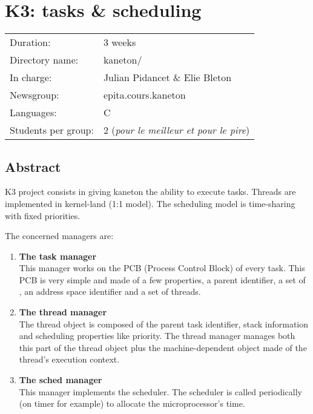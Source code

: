 
%
%

\chapter{K3: tasks \& scheduling}

%
%

\begin{tabular}{p{7cm}l}
Duration: & 3 weeks \\
Directory name: & kaneton/ \\
In charge: & Julian Pidancet \& Elie Bleton\\
Newsgroup: & epita.cours.kaneton \\
Languages: & C \\
Students per group: & 2 (\textit{pour le meilleur et pour le pire}) \\
\end{tabular}

\section{Abstract}

K3 project consists in giving kaneton the ability to execute
tasks. Threads are implemented in kernel-land (1:1 model). The
scheduling model is time-sharing with fixed priorities.

The concerned managers are:

\begin{enumerate}
  \item
    {\bf The task manager}\\
    This manager works on the PCB (Process Control Block) of every
    task. This PCB is very simple and made of a few properties, a
    parent identifier, a set of , an address space identifier
    and a set of threads.
  \item
    {\bf The thread manager}\\
    The thread object is composed of the parent task identifier, stack
    information and scheduling properties like priority. The thread
    manager manages both this part of the thread object plus the
    machine-dependent object made of the thread's execution context.
  \item
    {\bf The sched manager}\\ This manager implements the
    scheduler. The scheduler is called periodically (on timer for
    example) to allocate the microprocessor's time.
\end{enumerate}


